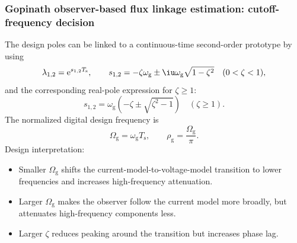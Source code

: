 
\begin{frame}
    \frametitle{Gopinath observer-based flux linkage estimation: cutoff-frequency decision}
    The design poles can be linked to a continuous-time second-order prototype by using
    \begin{equation}
        \lambda_{1,2}=\mathrm{e}^{s_{1,2}T_\mathrm{s}},
        \qquad
        s_{1,2}=-\zeta\omega_\mathrm{g}
        \pm\iu\omega_\mathrm{g}\sqrt{1-\zeta^2}
        \quad (0<\zeta<1),
    \end{equation}\pause%
    and the corresponding real-pole expression for $\zeta\geq 1$:
    \begin{equation}
        s_{1,2}=\omega_\mathrm{g}\left(-\zeta\pm\sqrt{\zeta^2-1}\right)
        \quad (\zeta\geq 1).
    \end{equation}\pause%
    The normalized digital design frequency is
    \begin{equation}
        \Omega_\mathrm{g}=\omega_\mathrm{g}T_\mathrm{s},
        \qquad
        \rho_\mathrm{g}=\frac{\Omega_\mathrm{g}}{\pi} .
    \end{equation}\pause%
    Design interpretation:
    \begin{itemize}
        \item Smaller $\Omega_\mathrm{g}$ shifts the current-model-to-voltage-model transition to lower frequencies and increases high-frequency attenuation.\pause%
        \item Larger $\Omega_\mathrm{g}$ makes the observer follow the current model more broadly, but attenuates high-frequency components less.\pause%
        \item Larger $\zeta$ reduces peaking around the transition but increases phase lag.
    \end{itemize}
\end{frame}




